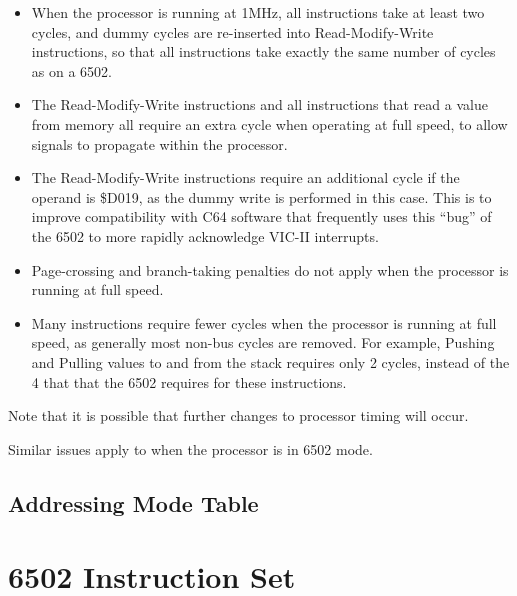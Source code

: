 \begin{itemize}
\item When the processor is running at 1MHz, all instructions take at least
  two cycles, and dummy cycles are re-inserted into Read-Modify-Write instructions,
  so that all instructions take exactly the same number of cycles as on a 6502.
\item The Read-Modify-Write instructions and all instructions that read a value from
  memory all require an extra cycle when operating at full speed, to allow signals
  to propagate within the processor.
\item The Read-Modify-Write instructions require an additional cycle if the operand
  is \$D019, as the dummy write is performed in this case.
  This is to improve compatibility with C64 software that frequently uses this
  ``bug'' of the 6502 to more rapidly acknowledge VIC-II interrupts.
\item Page-crossing and branch-taking penalties do not apply when the processor is
  running at full speed.
\item Many instructions require fewer cycles when the processor is running at full
  speed, as generally most non-bus cycles are removed. For example, Pushing and Pulling
  values to and from the stack requires only 2 cycles, instead of the 4 that that the
  6502 requires for these instructions.
\end{itemize}

Note that it is possible that further changes to processor timing will occur.

Similar issues apply to when the processor is in 6502 mode.
  
\begin{center}
\end{center}

\subsection{Addressing Mode Table}

\begin{center}
\end{center}




\section{6502 Instruction Set}

